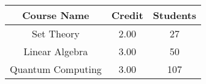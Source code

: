 \documentclass{article}
\begin{document}
	\begin{tabular}{|c|c|c|}
		\hline
		Course Name & Credit & Students\\
		\hline
		Set Theory & 2.00 & 27 \\
		\hline
		Linear Algebra & 3.00 & 50 \\
		\hline
		Quantum Computing & 3.00 & 107 \\
		\hline 
	\end{tabular}
\end{document}
